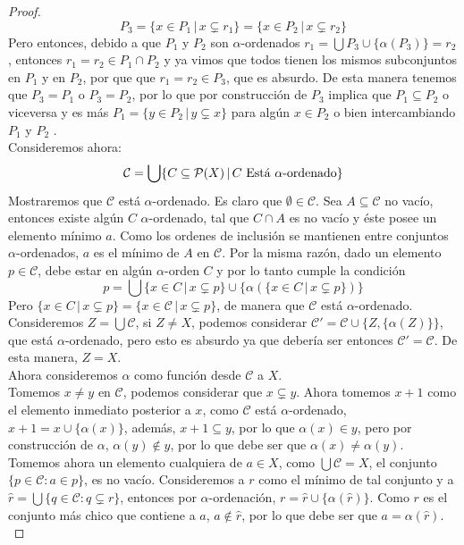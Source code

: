 \documentclass[12pt,a4paper]{book}
\begin{document}
\begin{teo}
\begin{proof}
$$P_3 = \{x \in P_1 \,\vert\, x \subsetneq r_1\} = \{x \in P_2 \,\vert\, x \subsetneq r_2\}$$
Pero entonces, debido a que $P_1$ y $P_2$ son $\alpha$-ordenados $r_1 = \bigcup P_3 \cup \{\alpha(P_3)\} = r_2$, entonces $r_1 = r_2 \in P_1 \cap P_2$ y ya vimos que todos tienen los mismos subconjuntos en $P_1$ y en $P_2$, por que que $r_1 = r_2 \in P_3$, que es absurdo. De esta manera tenemos que $P_3 = P_1$ o $P_3 = P_2$, por lo que por construcción de $P_3$ implica que $P_1 \subseteq P_2$ o viceversa y es más $P_1 = \{ y \in P_2 \,\vert\, y \subsetneq x\}$ para algún $x \in P_2$ o bien intercambiando $P_1$ y $P_2$ .\\
Consideremos ahora:
$$\mathcal{C}= \bigcup \{C \subseteq \P(X) \,\vert\, C \mbox{ Está $\alpha$-ordenado} \}$$
Mostraremos que $\mathcal{C}$ está $\alpha$-ordenado. Es claro que $\emptyset \in \mathcal{C}$.
Sea $A \subseteq \mathcal{C}$ no vacío, entonces existe algún $C$ $\alpha$-ordenado, tal que $C \cap A$ es no vacío y éste posee un elemento mínimo $a$. Como los ordenes de inclusión se mantienen entre conjuntos $\alpha$-ordenados, $a$ es el mínimo de $A$ en $\mathcal{C}$. Por la misma razón, dado un elemento $p \in \mathcal{C}$, debe estar en algún $\alpha$-orden $C$ y por lo tanto cumple la condición 
$$p = \bigcup \{ x \in C\,\vert\, x \subsetneq p\} \cup  \{ \alpha \left( \{ x \in C\,\vert\, x \subsetneq p\} \right) \}$$
Pero $\{ x \in C\,\vert\, x \subsetneq p\} = \{ x \in \mathcal{C}\,\vert\, x \subsetneq p\}$, de manera que $\mathcal{C}$ está $\alpha$-ordenado.\\
Consideremos $ Z = \bigcup \mathcal{C}$, si $Z \neq X$, podemos considerar $\mathcal{C}' = \mathcal{C} \cup \{Z , \{\alpha(Z)\}\}$, que está $\alpha$-ordenado, pero esto es absurdo ya que debería ser entonces $\mathcal{C}' = \mathcal{C}$. De esta manera, $Z = X$.\\
Ahora consideremos $\alpha$ como función desde $\mathcal{C}$ a $X$. \\
Tomemos $x \neq y$ en $\mathcal{C}$, podemos considerar que $x \subsetneq y$. Ahora tomemos $x + 1$ como el elemento inmediato posterior a $x$, como $\mathcal{C}$ está $\alpha$-ordenado, $x+1 = x \cup \{\alpha(x)\}$, además, $x+1 \subseteq y$, por lo que $\alpha(x) \in y$, pero por construcción de $\alpha$, $\alpha(y) \notin y$, por lo que debe ser que $\alpha(x) \neq \alpha(y)$.
Tomemos ahora un elemento cualquiera de $a \in X$, como $\bigcup \mathcal{C} = X$, el conjunto $\{p \in \mathcal{C} : a \in p\}$, es no vacío. Consideremos a $r$ como el mínimo de tal conjunto y a $\hat{r} = \bigcup \{ q \in \mathcal{C} : q \subsetneq r\}$, entonces por $\alpha$-ordenación, $r = \hat{r} \cup \{\alpha(\hat{r})\}$. Como $r$ es el conjunto más chico que contiene a $a$, $a \notin \hat{r}$, por lo que debe ser que $a = \alpha(\hat{r})$.\\

\end{proof}
\end{teo}
\end{document}
